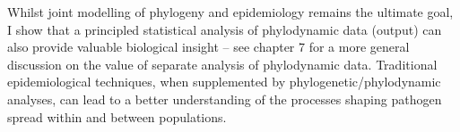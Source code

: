 Whilst joint modelling of phylogeny and epidemiology remains the ultimate goal, I show that a principled statistical analysis of phylodynamic data (output) can also provide valuable biological insight -- see chapter 7 for a more general discussion on the value of separate analysis of phylodynamic data.
Traditional epidemiological techniques, when supplemented by phylogenetic/phylodynamic analyses, can lead to a better understanding of the processes shaping pathogen spread within and between populations.
